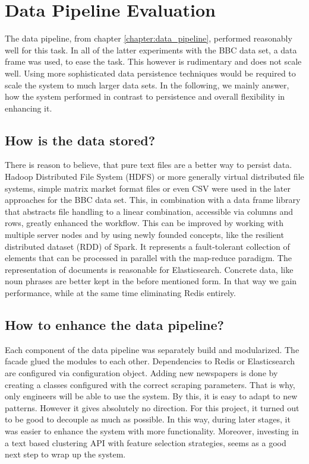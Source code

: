 \section{Data Pipeline Evaluation}
The data pipeline, from chapter \ref{chapter:data_pipeline}, performed reasonably well for this task. In all of the latter experiments with the BBC data set, a data frame was used, to ease the task. This however is rudimentary and does not scale well. Using more sophisticated data persistence techniques would be required to scale the system to much larger data sets. In the following, we mainly answer, how the system performed in contrast to persistence and overall flexibility in enhancing it.

\subsection*{How is the data stored?} 
There is reason to believe, that pure text files are a better way to persist data. Hadoop Distributed File System (HDFS) or more generally virtual distributed file systems, simple matrix market format files or even CSV were used in the later approaches for the BBC data set. This, in combination with a data frame library that abstracts file handling to a linear combination, accessible via columns and rows, greatly enhanced the workflow. This can be improved by working with multiple server nodes and by using newly founded concepts, like the resilient distributed dataset (RDD) of Spark. It represents a fault-tolerant collection of elements that can be processed in parallel with the map-reduce paradigm. The representation of documents is reasonable for Elasticsearch. Concrete data, like noun phrases are better kept in the before mentioned form. In that way we gain performance, while at the same time eliminating Redis entirely.

\subsection*{How to enhance the data pipeline?} 
Each component of the data pipeline was separately build and modularized. The facade glued the modules to each other. Dependencies to Redis or Elasticsearch are configured via configuration object. Adding new newspapers is done by creating a classes configured with the correct scraping parameters. That is why, only engineers will be able to use the system. By this, it is easy to adapt to new patterns. However it gives absolutely no direction. For this project, it turned out to be good to decouple as much as possible. In this way, during later stages, it was easier to enhance the system with more functionality. Moreover, investing in a text based clustering API with feature selection strategies, seems as a good next step to wrap up the system. 

